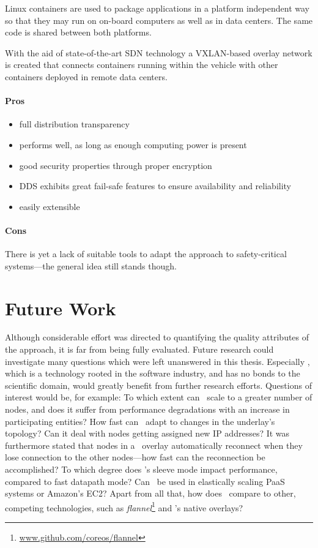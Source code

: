 Linux containers are used to package applications in a platform independent way so that they may run on on-board computers as well as in data centers. The same code is shared between both platforms.

With the aid of state-of-the-art SDN technology a VXLAN-based overlay network is created that connects containers running within the vehicle with other containers deployed in remote data centers. 


\paragraph{Pros}
\begin{itemize}
	\item full distribution transparency
	\item performs well, as long as enough computing power is present
	\item good security properties through proper encryption
	\item DDS exhibits great fail-safe features to ensure availability and reliability
	\item easily extensible
\end{itemize}


\paragraph{Cons}


There is yet a lack of suitable tools to adapt the approach to safety-critical systems---the general idea still stands though.

\section{Future Work}
Although considerable effort was directed to quantifying the quality attributes of the approach, it is far from being fully evaluated. Future research could investigate many questions which were left unanswered in this thesis. Especially \wnet , which is a technology rooted in the software industry, and has no bonds to the scientific domain, would greatly benefit from further research efforts. Questions of interest would be, for example: To which extent can \wnet\ scale to a greater number of nodes, and does it suffer from performance degradations with an increase in participating entities? How fast can \wnet\ adapt to changes in the underlay's topology? Can it deal with nodes getting assigned new IP addresses? It was furthermore stated that nodes in a \wnet\ overlay automatically reconnect when they lose connection to the other nodes---how fast can the reconnection be accomplished? To which degree does \weave 's sleeve mode impact performance, compared to fast datapath mode? Can \weave\ be used in elastically scaling PaaS systems or Amazon's EC2? Apart from all that, how does \weave\ compare to other, competing technologies, such as \emph{flannel}\footnote{\url{www.github.com/coreos/flannel}} and \docker 's native overlays?

